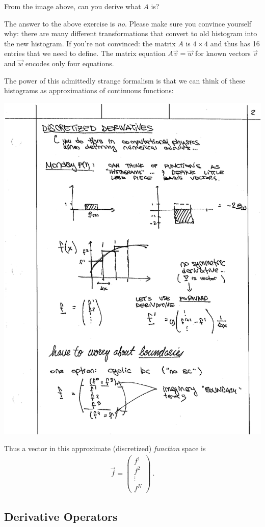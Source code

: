 \begin{exercise}
From the image above, can you derive what $A$ is? 
\end{exercise}

\noindent The answer to the above exercise is \emph{no}. Please make sure you convince yourself why: there are many different transformations that convert to old histogram into the new histogram. If you're not convinced: the matrix $A$ is $4\times 4$ and thus has 16 entries that we need to define. The matrix equation $A\vec{v} = \vec{w}$ for known vectors $\vec{v}$ and $\vec{w}$ encodes only four equations.

The power of this admittedly strange formalism is that we can think of these histograms as approximations of continuous functions:

\begin{center}
\includegraphics[width=.4\textwidth]{figures/lec02_histfun.pdf}
\end{center}

Thus a vector in this approximate (discretized) \emph{function} space is 
\begin{align}
  \vec{f} = 
  \begin{pmatrix}
    f^1 \\
    f^2 \\
    \vdots\\
    f^N
  \end{pmatrix} \ .
\end{align}

\subsection{Derivative Operators}

